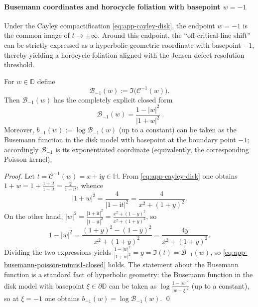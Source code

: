 \paragraph{Busemann coordinates and horocycle foliation with basepoint \texorpdfstring{$w=-1$}{w=-1}}\label{par:app-horocycle-busemann}
Under the Cayley compactification \eqref{eq:app-cayley-disk}, the endpoint \(w=-1\) is the common image of \(t\to\pm\infty\).
Around this endpoint, the ``off-critical-line shift'' can be strictly expressed as a hyperbolic-geometric coordinate with basepoint \(-1\), thereby yielding a horocycle foliation aligned with the Jensen defect resolution threshold.

\begin{proposition}\label{prop:app-busemann-poisson-minus1}
For \(w\in\mathbb{D}\) define
\[
\mathcal{B}_{-1}(w):=\Im\bigl(\mathcal{C}^{-1}(w)\bigr).
\]
Then \(\mathcal{B}_{-1}(w)\) has the completely explicit closed form
\begin{equation}\label{eq:app-busemann-poisson-minus1-closed}
\boxed{\;
\mathcal{B}_{-1}(w)
=\frac{1-|w|^{2}}{|1+w|^{2}}
\; }.
\end{equation}
Moreover, \(b_{-1}(w):=\log\mathcal{B}_{-1}(w)\) (up to a constant) can be taken as the Busemann function in the disk model with basepoint at the boundary point \(-1\); accordingly \(\mathcal{B}_{-1}\) is its exponentiated coordinate (equivalently, the corresponding Poisson kernel).
\end{proposition}

\begin{proof}
Let \(t=\mathcal{C}^{-1}(w)=x+\mathrm{i}y\in\mathbb{H}\).
From \eqref{eq:app-cayley-disk} one obtains
\(
1+w=1+\frac{1+\mathrm{i}t}{1-\mathrm{i}t}=\frac{2}{1-\mathrm{i}t}
\), whence
\[
|1+w|^{2}=\frac{4}{|1-\mathrm{i}t|^{2}}
=\frac{4}{x^{2}+(1+y)^{2}}.
\]
On the other hand,
\(
|w|^{2}=\frac{|1+\mathrm{i}t|^{2}}{|1-\mathrm{i}t|^{2}}
=\frac{x^{2}+(1-y)^{2}}{x^{2}+(1+y)^{2}}
\), so
\[
1-|w|^{2}
=\frac{(1+y)^{2}-(1-y)^{2}}{x^{2}+(1+y)^{2}}
=\frac{4y}{x^{2}+(1+y)^{2}}.
\]
Dividing the two expressions yields
\(
\frac{1-|w|^{2}}{|1+w|^{2}}=y=\Im(t)=\mathcal{B}_{-1}(w)
\), so \eqref{eq:app-busemann-poisson-minus1-closed} holds.
The statement about the Busemann function is a standard fact of hyperbolic geometry: the Busemann function in the disk model with basepoint \(\xi\in\partial\mathbb{D}\) can be taken as \(\log\frac{1-|w|^{2}}{|w-\xi|^{2}}\) (up to a constant), so at \(\xi=-1\) one obtains \(b_{-1}(w)=\log\mathcal{B}_{-1}(w)\). \qed
\end{proof}

